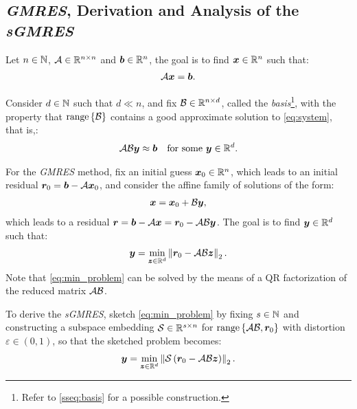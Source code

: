 \subsection{\textit{GMRES}, Derivation and Analysis of the \textit{sGMRES}}

Let $n \in \mathbb{N}$,  $\mathcal{A} \in \mathbb{R}^{n \times n}$ and $\bm{b} \in \mathbb{R}^{n}$, the goal is to find $\bm{x} \in \mathbb{R}^{n}$ such that:
\begin{align}
    \mathcal{A} \bm{x} = \bm{b}. \label{eq:system}
\end{align}

Consider $d \in \mathbb{N}$ such that $d \ll n$, and fix $\mathcal{B} \in \mathbb{R}^{n \times d}$, called the \textit{basis}\footnote{Refer to \cref{sseq:basis} for a possible construction.}, with the property that $\operatorname*{range}\left\{\mathcal{B}\right\}$ contains a good approximate solution to \cref{eq:system}, that is,:
\begin{align}
    \mathcal{A} \mathcal{B} \bm{y} &\approx \bm{b} &\text{for some } \bm{y} \in \mathbb{R}^{d}. \label{eq:app_system}
\end{align}

For the \textit{GMRES} method, fix an initial guess $\bm{x}_0 \in \mathbb{R}^{n}$, which leads to an initial residual $\bm{r}_0 = \bm{b} - \mathcal{A} \bm{x}_0$, and consider the affine family of solutions of the form:
\begin{align}
    \bm{x} = \bm{x}_0 + \mathcal{B} \bm{y},
\end{align}
which leads to a residual $\bm{r} = \bm{b} - \mathcal{A} \bm{x} = \bm{r}_0 - \mathcal{A} \mathcal{B} \bm{y}$. The goal is to find $\bm{y} \in \mathbb{R}^{d}$ such that:
\begin{align}
    \bm{y} = \min_{\bm{z} \in \mathbb{R}^{d}} \left\lVert \bm{r}_0 - \mathcal{A} \mathcal{B} \bm{z} \right\rVert_2. \label{eq:min_problem}
\end{align}
Note that \cref{eq:min_problem} can be solved by the means of a QR factorization of the reduced matrix $\mathcal{A} \mathcal{B}$.

To derive the \textit{sGMRES}, sketch \cref{eq:min_problem} by fixing $s \in \mathbb{N}$ and constructing a subspace embedding $\mathcal{S} \in \mathbb{R}^{s \times n}$ for $\operatorname*{range}\left\{\mathcal{A} \mathcal{B}, \bm{r}_0\right\}$ with distortion $\varepsilon \in \left(0, 1\right)$, so that the sketched problem becomes:
\begin{align}
    \bm{y} = \min_{\bm{z} \in \mathbb{R}^{d}} \left\lVert  \mathcal{S} \left( \bm{r}_0 - \mathcal{A} \mathcal{B} \bm{z} \right) \right\rVert_2. \label{eq:sketched_min_problem}
\end{align}

